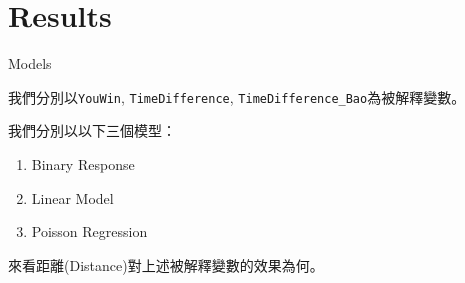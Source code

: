 

\section{Results}



\begin{frame}[fragile]{Models}

我們分別以\texttt{YouWin}, \texttt{TimeDifference}, \texttt{TimeDifference\_Bao}為被解釋變數。

我們分別以以下三個模型：
\begin{enumerate}
    \item Binary Response
    \item Linear Model
    \item Poisson Regression
\end{enumerate}

來看距離(Distance)對上述被解釋變數的效果為何。

\end{frame}


